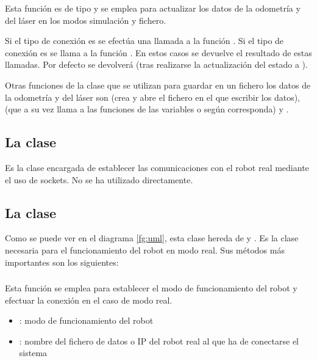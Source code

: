 \noindent
Esta función es de tipo  y se emplea para actualizar los datos de la odometría y del láser en los modos simulación y fichero.

\noindent
Si el tipo de conexión es  se efectúa una llamada a la función . Si el tipo de conexión es  se llama a la función . En estos casos se devuelve el resultado de estas llamadas. Por defecto se devolverá  (tras realizarse la actualización del estado a  ).

\vspace{0.2cm}
Otras funciones de la clase que se utilizan para guardar en un fichero los datos de la odometría y del láser son  (crea y abre el fichero en el que escribir los datos),  (que a su vez llama a las funciones  de las variables  o  según corresponda) y .

\subsection{La clase }
Es la clase encargada de establecer las comunicaciones con el robot real mediante el uso de sockets. No se ha utilizado directamente.

\subsection{La clase }
Como se puede ver en el diagrama \ref{fg:uml}, esta clase hereda de y . Es la clase necesaria para el funcionamiento del robot en modo real. Sus métodos más importantes son los siguientes:

\subsubsection{}

\noindent
{}

\noindent
Esta función se emplea para establecer el modo de funcionamiento del robot y efectuar la conexión en el caso de modo real.
\begin{itemize}
  \item {}: modo de funcionamiento del robot
  \item {}: nombre del fichero de datos o IP del robot real al que ha de conectarse el sistema
\end{itemize}

